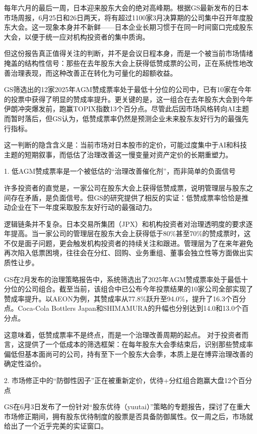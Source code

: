 \documentclass[11pt]{ctexart}
\begin{document}
每年六月的最后一周，日本迎来股东大会的绝对高峰期。根据GS最新发布的日本市场周报，6月25日和26日两天，将有超过1100家3月决算期的公司集中召开年度股东大会。这一现象本身并不新鲜——日本企业长期习惯于在同一时间窗口完成股东大会，以便于统一应对机构投资者的集中质询。

但这份报告真正值得关注的判断，并不是会议日程本身，而是一个被当前市场情绪掩盖的结构性信号：那些在去年股东大会上获得低赞成票的公司，正在系统性地改善治理表现，而这种改善正在转化为可量化的超额收益。

GS筛选出的12家2025年AGM赞成票率处于最低十分位的公司中，已有10家在今年的投票中获得了明显的赞成率提升。更关键的是，这一组合在去年股东大会到今年伊朗冲突爆发前，跑赢TOPIX指数13个百分点。尽管此后因市场风格转向AI主题而暂时落后，但GS认为，低赞成票率仍然是预测企业未来股东友好行为的最强先行指标。

这一判断的隐含含义是：当前市场对日本股市的定价，可能过度集中于AI和科技主题的短期叙事，而低估了治理改善这一慢变量对资产定价的长期重塑力。

1. 低AGM赞成票率是一个被低估的“治理改善催化剂”，而非简单的负面信号

许多投资者的直觉是，一家公司在股东大会上获得低赞成票，说明管理层与股东之间存在矛盾，是负面信号。但GS的研究提供了相反的实证：低赞成票率恰恰是推动企业在下一年度采取股东友好行动的最强动力。

逻辑链条并不复杂。日本交易所集团（JPX）和机构投资者对治理透明度的要求逐年提高。当一家公司的管理层在股东大会上获得低于80\%甚至70\%的赞成票时，这不仅是面子问题，更会触发机构投资者的持续关注和跟进。管理层为了在来年避免再次陷入低票困境，往往会在分红、回购、业务重组、董事会独立性等方面做出实质性让步。

GS在2月发布的治理策略报告中，系统筛选出了2025年AGM赞成票率处于最低十分位的公司组合。截至当前，该组合中已公布今年投票结果的10家公司全部实现了赞成率提升。以AEON为例，其赞成率从77.8\%跃升至94.0\%，提升了16.3个百分点。Coca-Cola Bottlers Japan和SHIMAMURA的升幅也分别达到14.0和13.0个百分点。

这意味着，低赞成票率不是终点，而是一个治理改善周期的起点。 对于投资者而言，这提供了一个低成本的筛选框架：在每年股东大会季结束后，识别那些赞成率偏低但基本面尚可的公司，持有至下一个股东大会季，本质上是在博弈治理改善的确定性溢价。

2. 市场修正中的“防御性因子”正在被重新定价，优待+分红组合跑赢大盘12个百分点

GS在6月3日发布了一份针对“股东优待（yuutai）”策略的专题报告，探讨了在重大市场修正期间，拥有股东优待制度的股票是否具备防御属性。仅一周之后，市场就给出了一个近乎完美的实证窗口。
\end{document}
